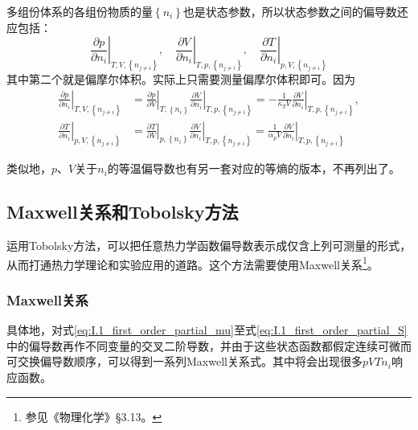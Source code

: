 \documentclass[main.tex]{subfiles}
\begin{document}
多组份体系的各组份物质的量$\left\{n_i\right\}$也是状态参数，所以状态参数之间的偏导数还应包括：
\[\left.\frac{\partial p}{\partial n_i}\right|_{T,V,\left\{n_{j\neq i}\right\}},\quad\left.\frac{\partial V}{\partial n_i}\right|_{T,p,\left\{n_{j\neq i}\right\}},\quad\left.\frac{\partial T}{\partial n_i}\right|_{p,V,\left\{n_{j\neq i}\right\}}\]
其中第二个就是偏摩尔体积。实际上只需要测量偏摩尔体积即可。因为
\begin{align*}
    \left.\frac{\partial p}{\partial n_i}\right|_{T,V,\left\{n_{j\neq i}\right\}} & =\left.\frac{\partial p}{\partial V}\right|_{T,\left\{n_i\right\}}\left.\frac{\partial V}{\partial n_i}\right|_{T,p,\left\{n_{j\neq i}\right\}}=-\frac{1}{\kappa_TV}\left.\frac{\partial V}{\partial n_i}\right|_{T,p,\left\{n_{j\neq i}\right\}}, \\
    \left.\frac{\partial T}{\partial n_i}\right|_{p,V,\left\{n_{j\neq i}\right\}} & =\left.\frac{\partial T}{\partial V}\right|_{p,\left\{n_i\right\}}\left.\frac{\partial V}{\partial n_i}\right|_{T,p,\left\{n_{j\neq i}\right\}}=\frac{1}{\alpha_p V}\left.\frac{\partial V}{\partial n_i}\right|_{T,p,\left\{n_{j\neq i}\right\}}
\end{align*}

类似地，$p$、$V$关于$n_i$的等温偏导数也有另一套对应的等熵的版本，不再列出了。

\subsection{Maxwell关系和Tobolsky方法}
运用Tobolsky方法\cite{Tobolsky1942}，可以把任意热力学函数偏导数表示成仅含上列可测量的形式，从而打通热力学理论和实验应用的道路。这个方法需要使用Maxwell关系\footnote{参见《物理化学》\S 3.13。}。

\subsubsection{Maxwell关系}
具体地，对式\eqref{eq:I.1_first_order_partial_mu}至式\eqref{eq:I.1_first_order_partial_S}中的偏导数再作不同变量的交叉二阶导数，并由于这些状态函数都假定连续可微而可交换偏导数顺序，可以得到一系列Maxwell关系式。其中将会出现很多$pVTn_i$响应函数。
\end{document}
